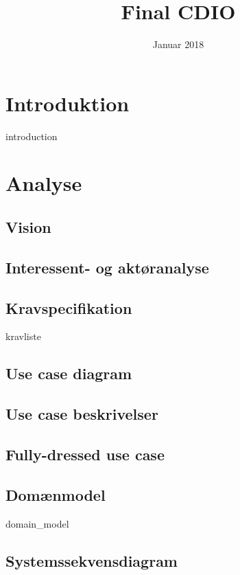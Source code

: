 \documentclass{article}
\title{Final CDIO}
\author{}
\date{Januar 2018}
\begin{document}
{\selectfont
\maketitle
\thispagestyle{empty}
\newpage
\tableofcontents
\thispagestyle{empty}
\newpage
\clearpage
\setcounter{page}{1}

\section{Introduktion}
{introduction}

\section{Analyse}
\subsection{Vision}

\subsection{Interessent- og aktøranalyse}

\subsection{Kravspecifikation}
{kravliste}

\subsection{Use case diagram}

\subsection{Use case beskrivelser}


\subsection{Fully-dressed use case}


\subsection{Domænmodel}
{domain_model}

\subsection{Systemssekvensdiagram}

}
\end{document}
